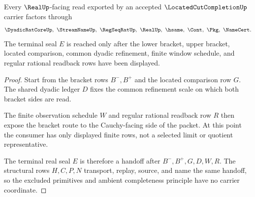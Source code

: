 \begin{theorem}\label{thm:located-cut-completion-real-seal-handoff}
Every $\RealUp$-facing read exported by an accepted $\LocatedCutCompletionUp$ carrier factors through
$$
\DyadicRatCoreUp,\ \StreamNameUp,\ \RegSeqRatUp,\ \RealUp,\ \hsame,\ \Cont,\ \Pkg,\ \NameCert .
$$
The terminal seal $E$ is reached only after the lower bracket, upper bracket, located comparison, common dyadic refinement, finite window schedule, and regular rational readback rows have been displayed.
\end{theorem}
\begin{proof}
Start from the bracket rows $B^{-},B^{+}$ and the located comparison row $G$. The shared dyadic ledger $D$ fixes the common refinement scale on which both bracket sides are read.

The finite observation schedule $W$ and regular rational readback row $R$ then expose the bracket route to the Cauchy-facing side of the packet. At this point the consumer has only displayed finite rows, not a selected limit or quotient representative.

The terminal real seal $E$ is therefore a handoff after $B^{-},B^{+},G,D,W,R$. The structural rows $H,C,P,N$ transport, replay, source, and name the same handoff, so the excluded primitives and ambient completeness principle have no carrier coordinate.
\end{proof}




